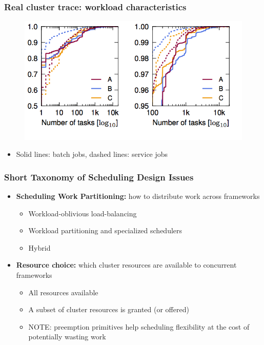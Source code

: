 \begin{frame}\frametitle{Real cluster trace: workload characteristics}
\begin{figure}[h]
  \centering
  \includegraphics[scale=0.4]{./figures/intro_trace2}
  \label{fig:intro_trace2}
\end{figure}
\begin{itemize}
	\item Solid lines: batch jobs, dashed lines: service jobs
\end{itemize}
\end{frame}

\begin{frame}\frametitle{Short Taxonomy of Scheduling Design Issues}
\begin{itemize}
	\item {\bf Scheduling Work Partitioning:} how to distribute work across frameworks
	\begin{itemize}
		\item Workload-oblivious load-balancing
		\item Workload partitioning and specialized schedulers
		\item Hybrid
	\end{itemize}

\vspace{20pt}

	\item {\bf Resource choice:} which cluster resources are available to concurrent frameworks
	\begin{itemize}
		\item All resources available
		\item A subset of cluster resources is granted (or offered)
		\item NOTE: preemption primitives help scheduling flexibility at the cost of potentially wasting work
	\end{itemize}
\end{itemize}
\end{frame}

